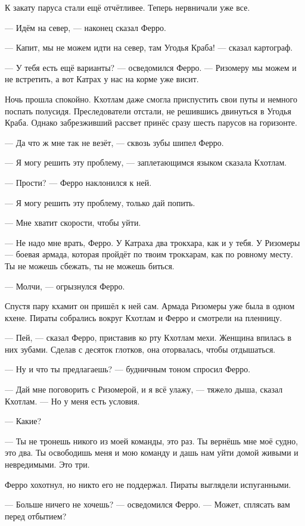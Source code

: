 К закату паруса стали ещё отчётливее.
Теперь нервничали уже все.

--- Идём на север, --- наконец сказал Ферро.

--- Капит, мы не можем идти на север, там Угодья Краба! --- сказал картограф.

--- У тебя есть ещё варианты? --- осведомился Ферро.
--- Ризомеру мы можем и не встретить, а вот Катрах у нас на корме уже висит.

Ночь прошла спокойно.
Кхотлам даже смогла приспустить свои путы и немного поспать полусидя.
Преследователи отстали, не решившись двинуться в Угодья Краба.
Однако забрезживший рассвет принёс сразу шесть парусов на горизонте.

--- Да что ж мне так не везёт, --- сквозь зубы шипел Ферро.

--- Я могу решить эту проблему, --- заплетающимся языком сказала Кхотлам.

--- Прости? --- Ферро наклонился к ней.

--- Я могу решить эту проблему, только дай попить.

--- Мне хватит скорости, чтобы уйти.

--- Не надо мне врать, Ферро.
У Катраха два трокхара, как и у тебя.
У Ризомеры --- боевая армада, которая пройдёт по твоим трокхарам, как по ровному месту.
Ты не можешь сбежать, ты не можешь биться.

--- Молчи, --- огрызнулся Ферро.

Спустя пару кхамит он пришёл к ней сам.
Армада Ризомеры уже была в одном кхене.
Пираты собрались вокруг Кхотлам и Ферро и смотрели на пленницу.

--- Пей, --- сказал Ферро, приставив ко рту Кхотлам мехи.
Женщина впилась в них зубами.
Сделав с десяток глотков, она оторвалась, чтобы отдышаться.

--- Ну и что ты предлагаешь? --- будничным тоном спросил Ферро.

--- Дай мне поговорить с Ризомерой, и я всё улажу, --- тяжело дыша, сказал Кхотлам.
--- Но у меня есть условия.

--- Какие?

--- Ты не тронешь никого из моей команды, это раз.
Ты вернёшь мне моё судно, это два.
Ты освободишь меня и мою команду и дашь нам уйти домой живыми и невредимыми.
Это три.

Ферро хохотнул, но никто его не поддержал.
Пираты выглядели испуганными.

--- Больше ничего не хочешь? --- осведомился Ферро.
--- Может, сплясать вам перед отбытием?

